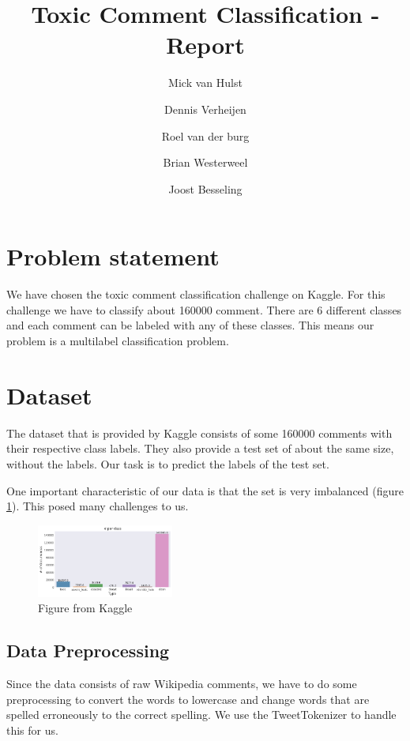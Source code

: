 \documentclass[10pt, a4paper,twocolumn]{article}
\title{Toxic Comment Classification - Report}
\author{Mick van Hulst \and Dennis Verheijen \and Roel van der burg \and Brian Westerweel \and Joost Besseling}
\begin{document}
	\maketitle
	
	\section{Problem statement}
	We have chosen the toxic comment classification challenge on Kaggle. For this challenge we have to classify about 160000 comment. There are 6 different classes and each comment can be labeled with any of these classes. This means our problem is a multilabel classification problem.
	
	\section{Dataset}
	
	The dataset that is provided by Kaggle consists of some 160000 comments with their respective class labels. They also provide a test set of about the same size, without the labels. Our task is to predict the labels of the test set.
	
	One important characteristic of our data is that the set is very imbalanced (figure \ref{fig:imbalance}). This posed many challenges to us.
	
	\begin{figure}[h]
		\includegraphics[width=0.4\textwidth]{img/distribution_histogram}
		\caption{Figure from Kaggle \cite{abc}}
		\label{fig:imbalance}
	\end{figure}
	
	
	\subsection*{Data Preprocessing}
	Since the data consists of raw Wikipedia comments, we have to do some preprocessing to convert the words to lowercase and change words that are spelled erroneously to the correct spelling. We use the TweetTokenizer to handle this for us.
	
\end{document}
